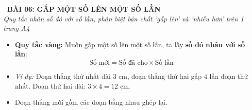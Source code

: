 \documentclass[12pt,a4paper]{article}
\begin{document}
\begin{tcolorbox}[
  enhanced,
  colback=teal!8!white,
  colframe=teal!70!black,
  arc=3mm, boxrule=1.2pt,
  left=3mm, right=3mm, top=2mm, bottom=2mm,
  halign=center
]
  {\LARGE\bfseries\color{teal!90!black}\faBookmark\ BÀI 06: GẤP MỘT SỐ LÊN MỘT SỐ LẦN}\\[1mm]
  {\itshape\footnotesize\color{black!75} Quy tắc nhân số đó với số lần, phân biệt bản chất 'gấp lên' và 'nhiều hơn' trên 1 trang A4}
\end{tcolorbox}

\vspace{-2mm}

\noindent
\begin{minipage}[t]{0.49\textwidth}\vspace{0pt}
\begin{tcolorbox}[
  enhanced,
  colback=blue!4!white,
  colframe=blue!75!black,
  arc=2mm, boxrule=0.8pt,
  left=2mm, right=2mm, top=1.8mm, bottom=1.8mm,
  title={\footnotesize\bfseries\color{white}\faMagic\ 1. Quy tắc Gấp lên một số lần}
]
{\footnotesize
\begin{itemize}\setlength{\itemsep}{1pt}\setlength{\leftskip}{-2.5mm}
  \item \textbf{Quy tắc vàng:} Muốn gấp một số lên một số lần, ta lấy \textbf{số đó nhân với số lần}:
  $$\text{Số mới} = \text{Số đã cho} \times \text{Số lần}$$
  \item \textit{Ví dụ:} Đoạn thẳng thứ nhất dài $3\text{ cm}$, đoạn thẳng thứ hai gấp $4$ lần đoạn thứ nhất. Đoạn thứ hai dài: $3 \times 4 = 12\text{ cm}$.
  \item Đoạn thẳng mới gồm các đoạn bằng nhau ghép lại.
\end{itemize}
}
\end{tcolorbox}
\end{minipage}
\hfill
\end{document}
